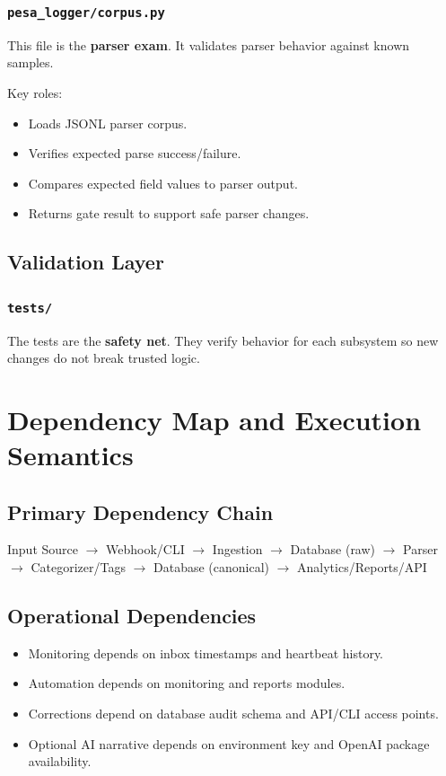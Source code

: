 \documentclass[12pt,a4paper]{article}
\begin{document}
\subsubsection*{\texttt{pesa\_logger/corpus.py}}
This file is the \textbf{parser exam}. It validates parser behavior against known samples.

Key roles:
\begin{itemize}[leftmargin=1.5em]
  \item Loads JSONL parser corpus.
  \item Verifies expected parse success/failure.
  \item Compares expected field values to parser output.
  \item Returns gate result to support safe parser changes.
\end{itemize}

\subsection{Validation Layer}
\subsubsection*{\texttt{tests/}}
The tests are the \textbf{safety net}. They verify behavior for each subsystem so new changes do not break trusted logic.

\section{Dependency Map and Execution Semantics}
\subsection{Primary Dependency Chain}
\begin{center}
Input Source $\rightarrow$ Webhook/CLI $\rightarrow$ Ingestion $\rightarrow$ Database (raw) $\rightarrow$ Parser \\
$\rightarrow$ Categorizer/Tags $\rightarrow$ Database (canonical) $\rightarrow$ Analytics/Reports/API
\end{center}

\subsection{Operational Dependencies}
\begin{itemize}[leftmargin=1.5em]
  \item Monitoring depends on inbox timestamps and heartbeat history.
  \item Automation depends on monitoring and reports modules.
  \item Corrections depend on database audit schema and API/CLI access points.
  \item Optional AI narrative depends on environment key and OpenAI package availability.
\end{itemize}
\end{document}
